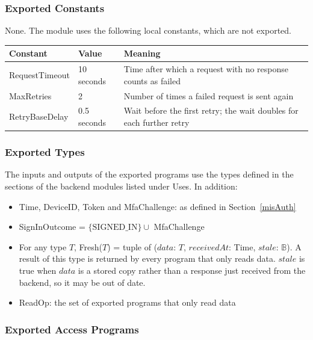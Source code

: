 \documentclass[12pt, titlepage]{article}
\begin{document}
\subsubsection{Exported Constants}

None. The module uses the following local constants, which are not exported.

\begin{center}
\renewcommand{\arraystretch}{1.2}
\begin{tabular}{l l >{\raggedright\arraybackslash}p{7.5cm}}
\toprule
\textbf{Constant} & \textbf{Value} & \textbf{Meaning}\\
\midrule
\textsf{RequestTimeout} & 10 seconds & Time after which a request with no
  response counts as failed\\
\textsf{MaxRetries} & 2 & Number of times a failed request is sent
  again\\
\textsf{RetryBaseDelay} & 0.5 seconds & Wait before the first retry; the
  wait doubles for each further retry\\
\bottomrule
\end{tabular}
\end{center}

\subsubsection{Exported Types}

\noindent The inputs and outputs of the exported programs use the types
defined in the sections of the backend modules listed under Uses. In
addition:

\begin{itemize}
\item Time, DeviceID, Token and MfaChallenge: as defined in
  Section~\ref{misAuth}
\item SignInOutcome = $\{\mathrm{SIGNED\_IN}\} \cup$ MfaChallenge
\item For any type $T$, Fresh($T$) = tuple of ($\mathit{data}$: $T$,
  $\mathit{receivedAt}$: Time, $\mathit{stale}$: $\mathbb{B}$). A result of
  this type is returned by every program that only reads data.
  $\mathit{stale}$ is true when $\mathit{data}$ is a stored copy rather than
  a response just received from the backend, so it may be out of date.
\item ReadOp: the set of exported programs that only read data
\end{itemize}

\subsubsection{Exported Access Programs}
\end{document}
